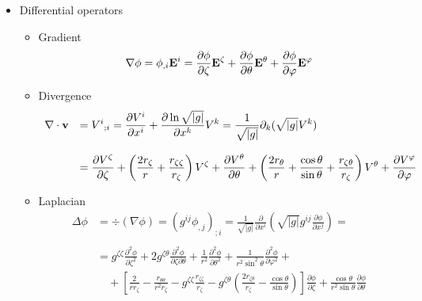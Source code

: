 \begin{itemize}
\begin{itemize}
\begin{equation}
\end{equation}
\end{itemize}
\item Differential operators
\begin{itemize}
\item Gradient
\begin{equation}
\nabla\phi=\phi_{,i}\mathbf{E}^i=\frac{\partial\phi}{\partial\zeta}\mathbf{E}^\zeta+
\frac{\partial\phi}{\partial\theta}\mathbf{E}^\theta+\frac{\partial\phi}{\partial\varphi}\mathbf{E}^\varphi
\end{equation}
\item Divergence
\begin{equation}
\begin{array}{rl}
\displaystyle\nabla\cdot\mathbf{v}&
\displaystyle ={V^i}_{;i}=
\frac{\partial V^i}{\partial x^i}+\frac{\partial\ln\sqrt{|g|}}{\partial
x^k}V^k=\frac{1}{\sqrt{|g|}}\partial_k(\sqrt{|g|}V^k)\\
\\
&\displaystyle =\frac{\partial V^\zeta}{\partial\zeta}+\left(\frac{2r_\zeta}{r}
+\frac{r_{\zeta\zeta}}{r_\zeta}
\right)V^\zeta+\frac{\partial V^\theta}{\partial\theta}+\left(\frac{2r_\theta}{r}+
\frac{\cos\theta}{\sin\theta}+\frac{r_{\zeta\theta}}{r_\zeta}\right)V^\theta+
\frac{\partial V^\varphi}{\partial\varphi}
\end{array}
\end{equation}
\item Laplacian
\begin{equation}
\begin{array}{rl}
\Delta\phi&
\displaystyle =\div(\nabla\phi)=(g^{ij}\phi_{,j})_{;i}=\frac{1}{\sqrt{|g|}}\frac{\partial}{\partial x^i}
\left(\sqrt{|g|}g^{ij}\frac{\partial\phi}{\partial x^j}\right)=\\
\\
&\displaystyle =
g^{\zeta\zeta}\frac{\partial^2\phi}{\partial\zeta^2}
+2g^{\zeta\theta}\frac{\partial^2\phi}{\partial\zeta\partial\theta}
+\frac{1}{r^2}\frac{\partial^2\phi}{\partial\theta^2}
+\frac{1}{r^2\sin^2\theta}\frac{\partial^2\phi}{\partial\varphi^2}
+\\
&\displaystyle\quad
+\left[\frac{2}{rr_\zeta}-\frac{r_{\theta\theta}}{r^2r_\zeta}
-g^{\zeta\zeta}\frac{r_{\zeta\zeta}}{r_\zeta}
-g^{\zeta\theta}\left(\frac{2r_{\zeta\theta}}{r_\zeta}-\frac{\cos\theta}{\sin\theta}\right)\right]
\frac{\partial\phi}{\partial\zeta}
+\frac{\cos\theta}{r^2\sin\theta}\frac{\partial\phi}{\partial\theta}
\end{array}
\end{equation}

\end{itemize}
\end{itemize}
